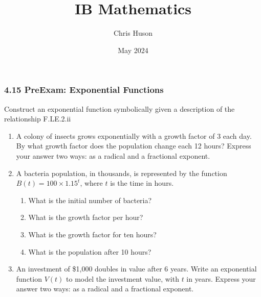 \documentclass[12pt, twoside]{article}
\title{IB Mathematics}
\author{Chris Huson}
\date{May 2024}
\begin{document}
\subsubsection*{4.15 PreExam: Exponential Functions}
Construct an exponential function symbolically given a description of the relationship \hfill F.LE.2.ii \\[0.5cm]

\begin{enumerate}
\item A colony of insects grows exponentially with a growth factor of $3$ each day. By what growth factor does the population change each 12 hours? Express your answer two ways: as a radical and a fractional exponent. \vspace{2cm}
\item A bacteria population, in thousands, is represented by the function $B(t)=100 \times 1.15^t$, where $t$ is the time in hours.
\begin{enumerate}
    \item What is the initial number of bacteria? \vspace{1cm}
    \item What is the growth factor per hour? \vspace{1cm}
    \item What is the growth factor for ten hours? \vspace{2cm}
    \item What is the population after 10 hours? \vspace{2cm}
\end{enumerate}

\item An investment of \$1,000 doubles in value after 6 years. Write an exponential function $V(t)$ to model the investment value, with $t$ in years. Express your answer two ways: as a radical and a fractional exponent.


\end{enumerate}
\end{document}
